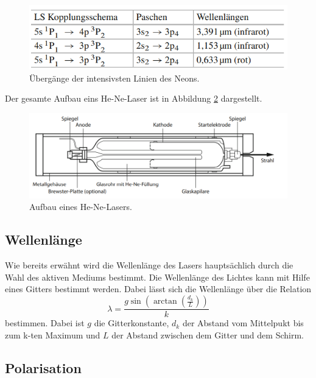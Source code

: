 \begin{figure}
    \centering
    \includegraphics[width=\textwidth]{Bilder/linie.PNG}
    \caption{Übergänge der intensivsten Linien des Neons.\cite{Laser}}
    \label{fig:linie}
\end{figure}

Der gesamte Aufbau eins He-Ne-Laser ist in Abbildung \ref{fig:he} dargestellt.

\begin{figure}
    \centering
    \includegraphics[width=\textwidth]{Bilder/he.PNG}
    \caption{Aufbau eines He-Ne-Lasers.\cite{Laser}}
    \label{fig:he}
\end{figure}


\subsection{Wellenlänge}

Wie bereits erwähnt wird die Wellenlänge des Lasers hauptsächlich durch die Wahl des aktiven Mediums bestimmt. 
Die Wellenlänge des Lichtes kann mit Hilfe eines Gitters bestimmt werden. Dabei lässt sich die Wellenlänge über die Relation
\begin{equation}
    \label{eqn:lamb}
    \lambda = \frac{g\sin{\left(\arctan{\left(\frac{d_k}{L}\right)}\right)}}{k}
\end{equation}
bestimmen. Dabei ist $g$ die Gitterkonstante, $d_k$ der Abstand vom Mittelpukt bis zum k-ten Maximum und $L$ der Abstand zwischen dem Gitter und dem Schirm.

\subsection{Polarisation}

